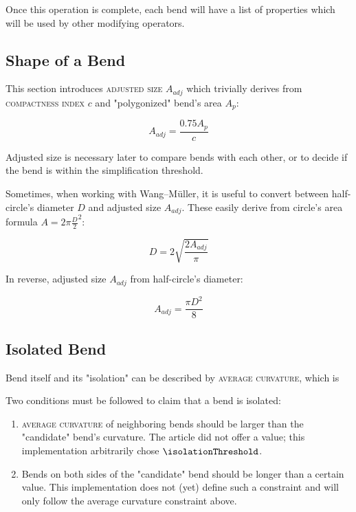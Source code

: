 \documentclass[a4paper]{article}
\newcommand{\WM}{Wang--M{\"u}ller}
\begin{document}
Once this operation is complete, each bend will have a list of properties
which will be used by other modifying operators.

\subsection{Shape of a Bend}
\label{sec:shape-of-a-bend}

This section introduces \textsc{adjusted size} $A_{adj}$ which trivially
derives from \textsc{compactness index} $c$ and "polygonized" bend's area $A_{p}$:

\[
  A_{adj} = \frac{0.75 A_{p}}{c}
\]

Adjusted size is necessary later to compare bends with each other, or to decide if
the bend is within the simplification threshold.

Sometimes, when working with {\WM}, it is useful to convert between
half-circle's diameter $D$ and adjusted size $A_{adj}$. These easily derive
from circle's area formula $A = 2\pi \frac{D}{2}^2$:

\[
  D = 2\sqrt{\frac{2 A_{adj}}{\pi}}
\]

In reverse, adjusted size $A_{adj}$ from half-circle's diameter:

\[
  A_{adj} = \frac{\pi D^2}{8}
\]

\subsection{Isolated Bend}
\label{sec:isolated-bend}

Bend itself and its "isolation" can be described by \textsc{average curvature},
which is 

Two conditions must be followed to claim that a bend is isolated:

\begin{enumerate}
    \item \textsc{average curvature} of neighboring bends should be larger
        than the "candidate" bend's curvature. The article did not offer a
        value; this implementation arbitrarily chose $\isolationThreshold$.

    \item Bends on both sides of the "candidate" bend should be longer than a
        certain value. This implementation does not (yet) define such a
        constraint and will only follow the average curvature constraint above.

\end{enumerate}
\end{document}
